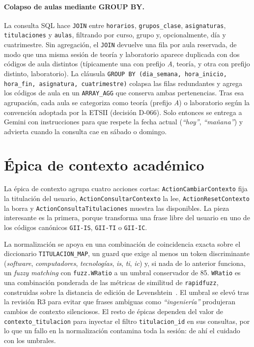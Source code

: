 \paragraph{Colapso de aulas mediante GROUP BY.} La consulta SQL hace \texttt{JOIN} entre \texttt{horarios}, \texttt{grupos\_clase}, \texttt{asignaturas}, \texttt{titulaciones} y \texttt{aulas}, filtrando por curso, grupo y, opcionalmente, día y cuatrimestre. Sin agregación, el \texttt{JOIN} devuelve una fila por aula reservada, de modo que una misma sesión de teoría y laboratorio aparece duplicada con dos códigos de aula distintos (típicamente una con prefijo \textit{A}, teoría, y otra con prefijo distinto, laboratorio). La cláusula \texttt{GROUP BY (dia\_semana, hora\_inicio, hora\_fin, asignatura, cuatrimestre)} colapsa las filas redundantes y agrega los códigos de aula en un \texttt{ARRAY\_AGG} que conserva ambas pertenencias. Tras esa agrupación, cada aula se categoriza como teoría (prefijo \textit{A}) o laboratorio según la convención adoptada por la ETSII (decisión D-066). Solo entonces se entrega a Gemini con instrucciones para que respete la fecha actual (\textit{``hoy''}, \textit{``mañana''}) y advierta cuando la consulta cae en sábado o domingo.

\section{Épica de contexto académico}\label{sec:impl-contexto}

La épica de contexto agrupa cuatro acciones cortas: \texttt{ActionCambiarContexto} fija la titulación del usuario, \texttt{ActionConsultarContexto} la lee, \texttt{ActionResetContexto} la borra y \texttt{ActionConsultaTitulaciones} muestra las disponibles. La pieza interesante es la primera, porque transforma una frase libre del usuario en uno de los códigos canónicos \texttt{GII-IS}, \texttt{GII-TI} o \texttt{GII-IC}.

La normalización se apoya en una combinación de coincidencia exacta sobre el diccionario \texttt{TITULACION\_MAP}, un guard que exige al menos un token discriminante (\textit{software}, \textit{computadores}, \textit{tecnologías}, \textit{is}, \textit{ti}, \textit{ic}) y, si nada de lo anterior funciona, un \textit{fuzzy matching} con \texttt{fuzz.WRatio} a un umbral conservador de 85. \texttt{WRatio} es una combinación ponderada de las métricas de similitud de \texttt{rapidfuzz}, construidas sobre la distancia de edición de Levenshtein~\cite{levenshtein1966binary}. El umbral se elevó tras la revisión R3 para evitar que frases ambiguas como \textit{``ingeniería''} produjeran cambios de contexto silenciosos. El resto de épicas dependen del valor de \texttt{contexto\_titulacion} para inyectar el filtro \texttt{titulacion\_id} en sus consultas, por lo que un fallo en la normalización contamina toda la sesión: de ahí el cuidado con los umbrales.

